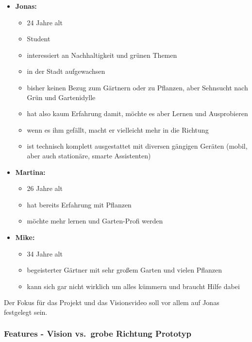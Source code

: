 \begin{itemize}
\tightlist
\item
  \textbf{Jonas:}

  \begin{itemize}
  \tightlist
  \item
    24 Jahre alt
  \item
    Student
  \item
    interessiert an Nachhaltigkeit und grünen Themen
  \item
    in der Stadt aufgewachsen
  \item
    bisher keinen Bezug zum Gärtnern oder zu Pflanzen, aber Sehnsucht
    nach Grün und Gartenidylle
  \item
    hat also kaum Erfahrung damit, möchte es aber Lernen und
    Ausprobieren
  \item
    wenn es ihm gefällt, macht er vielleicht mehr in die Richtung
  \item
    ist technisch komplett ausgestattet mit diversen gängigen Geräten
    (mobil, aber auch stationäre, smarte Assistenten)
  \end{itemize}
\item
  \textbf{Martina:}

  \begin{itemize}
  \tightlist
  \item
    26 Jahre alt
  \item
    hat bereits Erfahrung mit Pflanzen
  \item
    möchte mehr lernen und Garten-Profi werden
  \end{itemize}
\item
  \textbf{Mike:}

  \begin{itemize}
  \tightlist
  \item
    34 Jahre alt
  \item
    begeisterter Gärtner mit sehr großem Garten und vielen Pflanzen
  \item
    kann sich gar nicht wirklich um alles kümmern und braucht Hilfe
    dabei
  \end{itemize}
\end{itemize}

Der Fokus für das Projekt und das Visionsvideo soll vor allem auf Jonas
festgelegt sein.

\hypertarget{features1}{%
\subsubsection{Features - Vision vs.~grobe Richtung
Prototyp}\label{features1}}

